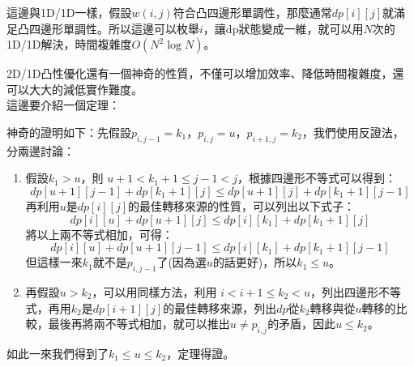 	這邊與1D/1D一樣，假設$w(i, j)$符合凸四邊形單調性，那麼通常$dp[i][j]$就滿足凸四邊形單調性。所以這邊可以枚舉$i$，讓dp狀態變成一維，就可以用$N$次的1D/1D解決，時間複雜度$O(N^2\log N)$。\\
	
	
	2D/1D凸性優化還有一個神奇的性質，不僅可以增加效率、降低時間複雜度，還可以大大的減低實作難度。\\
	
	這邊要介紹一個定理：\\
	
	
	神奇的證明如下：先假設$p_{i, j-1} = k_1$，$p_{i, j} = u$，$p_{i+1, j} = k_2$，我們使用反證法，分兩邊討論：
	
	\begin{enumerate}
		\item 假設$k_1 > u$，則 $u+1 < k_1+1 \leq j-1 < j $，根據四邊形不等式可以得到：
		\begin{displaymath}
		dp[u+1][j-1] + dp[k_1+1][j] \leq dp[u+1][j] + dp[k_1+1][j-1]
		\end{displaymath}
		再利用$u$是$dp[i][j]$的最佳轉移來源的性質，可以列出以下式子：
		\begin{displaymath}
		dp[i][u] + dp[u+1][j] \leq dp[i][k_1] + dp[k_1+1][j]
		\end{displaymath}
		將以上兩不等式相加，可得：
		\begin{displaymath}
		dp[i][u] + dp[u+1][j-1] \leq dp[i][k_1] + dp[k_1+1][j-1]
		\end{displaymath}
		但這樣一來$k_1$就不是$p_{i, j-1}$了(因為選$u$的話更好)，所以$k_1 \leq u$。
		
		\item 再假設$u > k_2$，可以用同樣方法，利用 $i < i+1 \leq k_2 < u $，列出四邊形不等式，再用$k_2$是$dp[i+1][j]$的最佳轉移來源，列出$dp$從$k_2$轉移與從$u$轉移的比較，最後再將兩不等式相加，就可以推出$u \neq p_{i, j}$的矛盾，因此$u \leq k_2$。
	\end{enumerate}
	
	如此一來我們得到了$k_1 \leq u \leq k_2$，定理得證。
	
